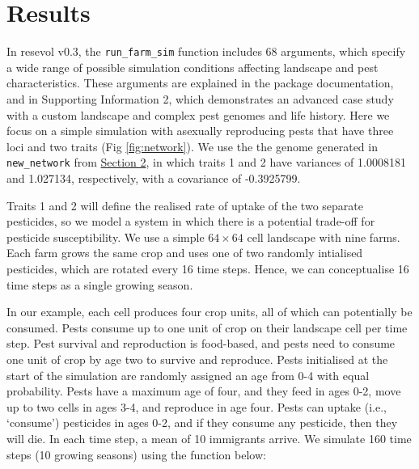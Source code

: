 \documentclass[
]{article}
\begin{document}
\hypertarget{simulation}{%
\section{Results}\label{simulation}}

In resevol v0.3, the \texttt{run\_farm\_sim} function includes 68 arguments, which specify a wide range of possible simulation conditions affecting landscape and pest characteristics.
These arguments are explained in the package documentation, and in Supporting Information 2, which demonstrates an advanced case study with a custom landscape and complex pest genomes and life history.
Here we focus on a simple simulation with asexually reproducing pests that have three loci and two traits (Fig \ref{fig:network}).
We use the the genome generated in \texttt{new\_network} from \protect\hyperlink{mine_gmatrix}{Section 2}, in which traits 1 and 2 have variances of 1.0008181 and 1.027134, respectively, with a covariance of -0.3925799.

Traits 1 and 2 will define the realised rate of uptake of the two separate pesticides, so we model a system in which there is a potential trade-off for pesticide susceptibility.
We use a simple \(64 \times 64\) cell landscape with nine farms.
Each farm grows the same crop and uses one of two randomly intialised pesticides, which are rotated every 16 time steps.
Hence, we can conceptualise 16 time steps as a single growing season.

In our example, each cell produces four crop units, all of which can potentially be consumed.
Pests consume up to one unit of crop on their landscape cell per time step.
Pest survival and reproduction is food-based, and pests need to consume one unit of crop by age two to survive and reproduce.
Pests initialised at the start of the simulation are randomly assigned an age from 0-4 with equal probability.
Pests have a maximum age of four, and they feed in ages 0-2, move up to two cells in ages 3-4, and reproduce in age four.
Pests can uptake (i.e., `consume') pesticides in ages 0-2, and if they consume any pesticide, then they will die.
In each time step, a mean of 10 immigrants arrive.
We simulate 160 time steps (10 growing seasons) using the function below:
\end{document}
